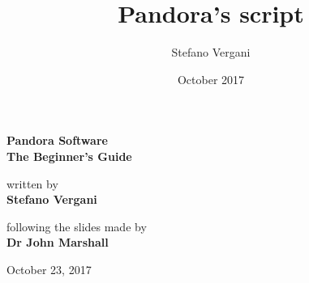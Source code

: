 \documentclass[9pt]{extreport}
\begin{document}
	\author{Stefano Vergani}
	\title{Pandora's script}
	\date{October 2017}


\begin{titlepage}
    \begin{center}
        \vspace*{0.7cm}
        
        \Huge
        \textbf{Pandora Software}\\
        \Large
	\textbf{The Beginner's Guide}
    
        \vspace{1.5cm}


        \Large
	written by\\
        \textbf{Stefano Vergani}

	\vspace{3cm}
	\Large
       
        following the slides made by\\
        \textbf{Dr John Marshall}
        
        \vspace{2cm}
        
        
        
        October 23, 2017
       
    \end{center}

\end{titlepage}








	\frontmatter
	\tableofcontents
%
\end{document}
